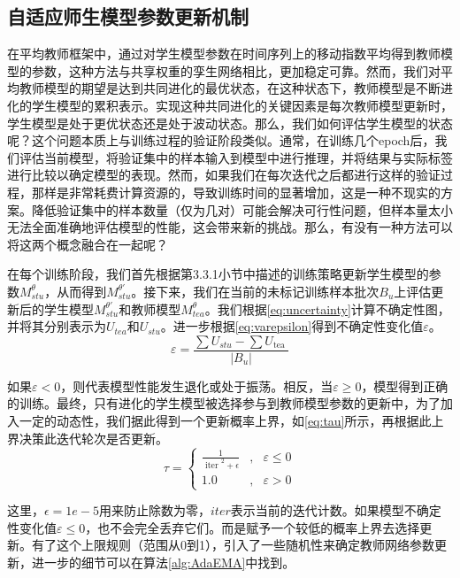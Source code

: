 \documentclass[lang=chs, degree=master, blindreview=false, adobe=false]{yanputhesis}
\begin{document}
\subsection{自适应师生模型参数更新机制}
在平均教师框架中，通过对学生模型参数在时间序列上的移动指数平均得到教师模型的参数，这种方法与共享权重的孪生网络相比，更加稳定可靠。然而，我们对平均教师模型的期望是达到共同进化的最优状态，在这种状态下，教师模型是不断进化的学生模型的累积表示。实现这种共同进化的关键因素是每次教师模型更新时，学生模型是处于更优状态还是处于波动状态。那么，我们如何评估学生模型的状态呢？这个问题本质上与训练过程的验证阶段类似。通常，在训练几个epoch后，我们评估当前模型，将验证集中的样本输入到模型中进行推理，并将结果与实际标签进行比较以确定模型的表现。然而，如果我们在每次迭代之后都进行这样的验证过程，那样是非常耗费计算资源的，导致训练时间的显著增加，这是一种不现实的方案。降低验证集中的样本数量（仅为几对）可能会解决可行性问题，但样本量太小无法全面准确地评估模型的性能，这会带来新的挑战。那么，有没有一种方法可以将这两个概念融合在一起呢？

在每个训练阶段，我们首先根据第3.3.1小节中描述的训练策略更新学生模型的参数$M^{\theta}_{stu}$，从而得到$M^{\theta'}_{stu}$。接下来，我们在当前的未标记训练样本批次$B_u$上评估更新后的学生模型$M^{\theta'}_{stu}$和教师模型$M^{\theta}_{tea}$。我们根据\ref{eq:uncertainty}计算不确定性图，并将其分别表示为$U_{tea}$和$U_{stu}$。进一步根据\ref{eq:varepsilon}得到不确定性变化值$\varepsilon$。
\begin{equation}
  \label{eq:varepsilon}
  \varepsilon=\frac{\sum U_{s t u}-\sum U_{\text {tea }}}{\left|B_{u}\right|}
\end{equation}

如果$\varepsilon < 0$，则代表模型性能发生退化或处于振荡。相反，当$\varepsilon \geqslant 0$，模型得到正确的训练。最终，只有进化的学生模型被选择参与到教师模型参数的更新中，为了加入一定的动态性，我们据此得到一个更新概率上界，如\autoref{eq:tau}所示，再根据此上界决策此迭代轮次是否更新。
\begin{equation}
  \label{eq:tau}
  \tau=\left\{\begin{array}{ccc}
    \frac{1}{\text { iter }^{2}+\epsilon} & , & \varepsilon \leq 0 \\
    1.0 & , & \varepsilon>0
    \end{array}\right.
\end{equation}

这里，$\epsilon=1e-5$用来防止除数为零，$iter$表示当前的迭代计数。如果模型不确定性变化值$\varepsilon \leqslant 0$，也不会完全丢弃它们。而是赋予一个较低的概率上界去选择更新。有了这个上限规则（范围从0到1），引入了一些随机性来确定教师网络参数更新，进一步的细节可以在算法\ref{alg:AdaEMA}中找到。
\end{document}
